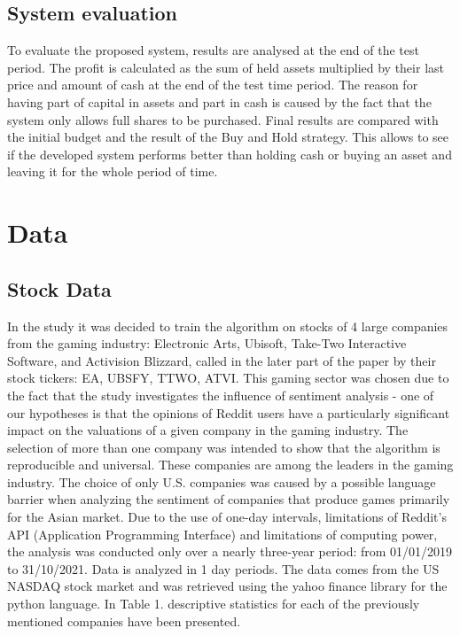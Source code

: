 \documentclass[11pt]{article} %
\begin{document}
\subsection{System evaluation}
To evaluate the proposed system, results are analysed at the end of the test period. The profit is calculated as the sum of held assets multiplied by their last price and amount of cash at the end of the test time period. The reason for having part of capital in assets and part in cash is caused by the fact that the  system only allows full shares to be purchased. Final results are compared with the initial budget and the result of the Buy and Hold strategy. This allows to see if the developed system performs better than holding cash or buying an asset and leaving it for the whole period of time. 

\section{Data}
\subsection{Stock Data}
In the study it was decided to train the algorithm on stocks of 4 large companies from the gaming industry: Electronic Arts, Ubisoft, Take-Two Interactive Software, and Activision Blizzard, called in the later part of the paper by their stock tickers: EA, UBSFY, TTWO, ATVI. This gaming sector was chosen due to the fact that the study investigates the influence of sentiment analysis - one of our hypotheses is that the opinions of Reddit users have a particularly significant impact on the valuations of a given company in the gaming industry.  The selection of more than one company was intended to show that the algorithm is reproducible and universal. These companies are among the leaders in the gaming industry. The choice of only U.S. companies was caused by a possible language barrier when analyzing the sentiment of companies that produce games primarily for the Asian market. Due to the use of one-day intervals, limitations of Reddit's API (Application Programming Interface) and limitations of computing power, the analysis was conducted only over a nearly three-year period: from 01/01/2019 to 31/10/2021. Data is analyzed in 1 day periods. The data comes from the US NASDAQ stock market and was retrieved using the yahoo finance library for the python language. In Table 1. descriptive statistics for each of the previously mentioned companies have been presented. 
\end{document}
